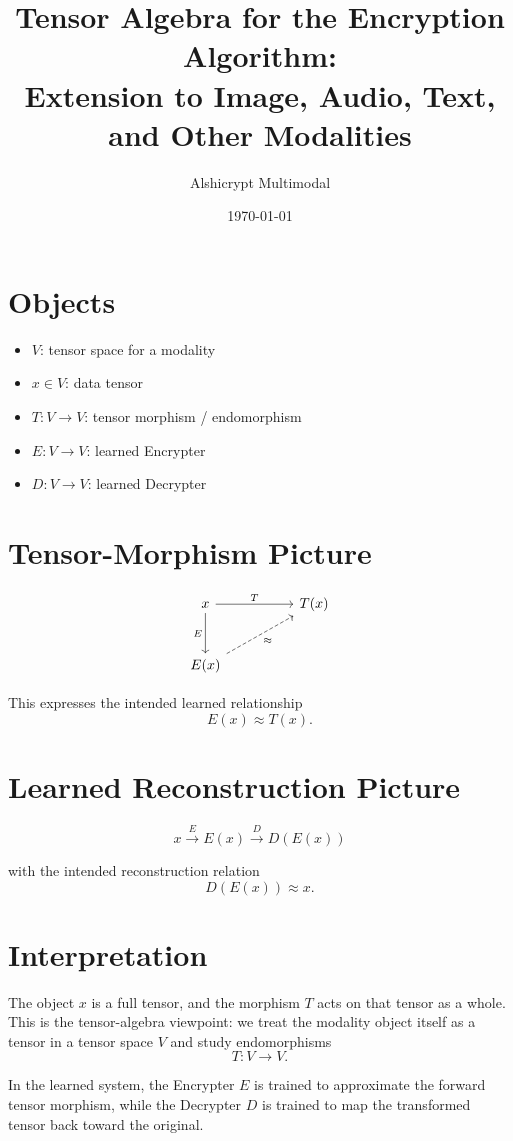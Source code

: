 \documentclass[11pt]{article}
\title{Tensor Algebra for the Encryption Algorithm:\\Extension to Image, Audio, Text, and Other Modalities}
\author{Alshicrypt Multimodal}
\date{\today}
\begin{document}
\maketitle

\section*{Objects}
\begin{itemize}
    \item $V$: tensor space for a modality
    \item $x \in V$: data tensor
    \item $T : V \to V$: tensor morphism / endomorphism
    \item $E : V \to V$: learned Encrypter
    \item $D : V \to V$: learned Decrypter
\end{itemize}

\section*{Tensor-Morphism Picture}
\[
\begin{tikzcd}[column sep=huge, row sep=large]
x \arrow[r, "T"] \arrow[d, "E"'] & T(x) \\
E(x) \arrow[ur, dashed, "\approx"'] &
\end{tikzcd}
\]

This expresses the intended learned relationship
\[
E(x) \approx T(x).
\]

\section*{Learned Reconstruction Picture}
\[
x \xrightarrow{\;E\;} E(x) \xrightarrow{\;D\;} D(E(x))
\]

with the intended reconstruction relation
\[
D(E(x)) \approx x.
\]

\section*{Interpretation}
The object $x$ is a full tensor, and the morphism $T$ acts on that tensor as a
whole. This is the tensor-algebra viewpoint: we treat the modality object
itself as a tensor in a tensor space $V$ and study endomorphisms
\[
T : V \to V.
\]

In the learned system, the Encrypter $E$ is trained to approximate the forward
tensor morphism, while the Decrypter $D$ is trained to map the transformed
tensor back toward the original.
\end{document}
